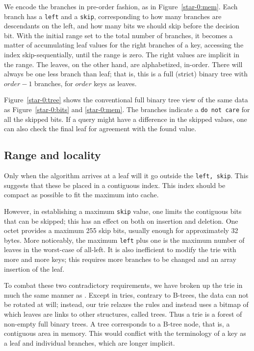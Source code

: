 \documentclass[14pt]{article}
\newcommand{\code}[1]{\colorbox{light-gray}{\texttt{#1}}}
\begin{document}
We encode the branches in pre-order fashion, as in Figure~\ref{star-0:mem}. Each branch has a \code{left} and a \code{skip}, corresponding to how many branches are descendants on the left, and how many bits we should skip before the decision bit. With the initial range set to the total number of branches, it becomes a matter of accumulating leaf values for the right branches of a key, accessing the index skip-sequentially, until the range is zero. The right values are implicit in the range. The leaves, on the other hand, are alphabetized, in-order. There will always be one less branch than leaf; that is, this is a full (strict) binary tree with $order - 1$ branches, for $order$ keys as leaves.

Figure~\ref{star-0:tree} shows the conventional full binary tree view of the same data as Figure~\ref{star-0:bits} and \ref{star-0:mem}. The branches indicate a \code{do not care} for all the skipped bits. If a query might have a difference in the skipped values, one can also check the final leaf for agreement with the found value.

\subsection{Range and locality}

Only when the algorithm arrives at a leaf will it go outside the \code{left, skip}. This suggests that these be placed in a contiguous index. This index should be compact as possible to fit the maximum into cache.

However, in establishing a maximum \code{skip} value, one limits the contiguous bits that can be skipped; this has an effect on both on insertion and deletion. One octet provides a maximum 255 skip bits, usually enough for approximately 32 bytes. More noticeably, the maximum \code{left} plus one is the maximum number of leaves in the worst-case of all-left. It is also inefficient to modify the trie with more and more keys; this requires more branches to be changed and an array insertion of the leaf.

To combat these two contradictory requirements, we have broken up the trie in much the same manner as \cite{bayer1972organization}. Except in tries, contrary to B-trees, the data can not be rotated at will; instead, our trie relaxes the rules and instead uses a bitmap of which leaves are links to other structures, called trees. Thus a trie is a forest of non-empty full binary trees. A tree corresponds to a B-tree node\cite{knuth1997sorting}, that is, a contiguous area in memory. This would conflict with the terminology of a key as a leaf and individual branches, which are longer implicit.
\end{document}
